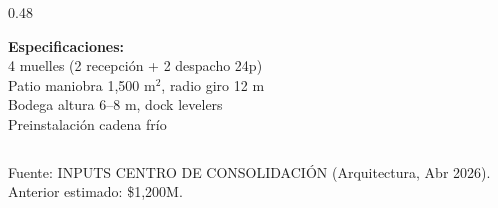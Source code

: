 \documentclass[aspectratio=169, 10pt]{beamer}
\begin{document}
\begin{frame}
\begin{columns}[T]
\begin{column}{0.48\textwidth}
    \vspace{4pt}
    \colorbox{azulclaro}{\parbox{\dimexpr\linewidth-8pt}{\tiny\strut
    \textcolor{azul}{\textbf{Especificaciones:}}\\
    4 muelles (2 recepci\'on + 2 despacho 24p)\\
    Patio maniobra 1,500 m$^2$, radio giro 12 m\\
    Bodega altura 6--8 m, dock levelers\\
    Preinstalaci\'on cadena fr\'io\strut}}
\end{column}
\end{columns}

\vspace{3pt}
{\tiny\color{gris} Fuente: INPUTS CENTRO DE CONSOLIDACI\'ON (Arquitectura, Abr 2026). Anterior estimado: \$1,200M.}
\end{frame}
\end{document}
